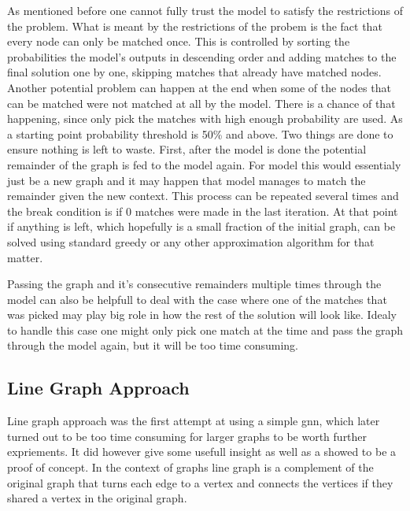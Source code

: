 As mentioned before one cannot fully trust the model to satisfy the restrictions of the problem. What is meant by the restrictions of the probem is the fact that every node can only be matched once. This is controlled by sorting the probabilities the model's outputs in descending order and adding matches to the final solution one by one, skipping matches that already have matched nodes. Another potential problem can happen at the end when some of the nodes that can be matched were not matched at all by the model. There is a chance of that happening, since only pick the matches with high enough probability are used. As a starting point probability threshold is 50\% and above. Two things are done to ensure nothing is left to waste. First, after the model is done the potential remainder of the graph is fed to the model again. For model this would essentialy just be a new graph and it may happen that model manages to match the remainder given the new context. This process can be repeated several times and the break condition is if 0 matches were made in the last iteration. At that point if anything is left, which hopefully is a small fraction of the initial graph, can be solved using standard greedy or any other approximation algorithm for that matter.

Passing the graph and it's consecutive remainders multiple times through the model can also be helpfull to deal with the case where one of the matches that was picked may play big role in how the rest of the solution will look like. Idealy to handle this case one might only pick one match at the time and pass the graph through the model again, but it will be too time consuming.

\subsection{Line Graph Approach}

Line graph approach was the first attempt at using a simple \gls{gnn}, which later turned out to be too time consuming for larger graphs to be worth further expriements. It did however give some usefull insight as well as a showed to be a proof of concept. In the context of graphs line graph is a complement of the original graph that turns each edge to a vertex and connects the vertices if they shared a vertex in the original graph. 

